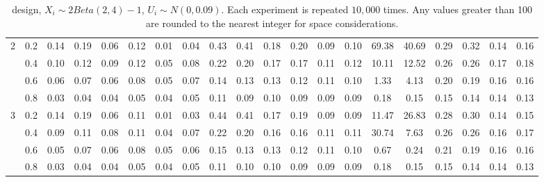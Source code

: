 \begin{table}
\begin{threeparttable}
\begin{tabular}{c c|c c c c c c|c c c c c c|c c c c c c}
\multirow{4}{*}{2} & 0.2 & 0.14 & 0.19 & 0.06 & 0.12 & 0.01 & 0.04 & 0.43 & 0.41 & 0.18 & 0.20 & 0.09 & 0.10 & 69.38 & 40.69 & 0.29 & 0.32 & 0.14 & 0.16 \\
& 0.4 & 0.10 & 0.12 & 0.09 & 0.12 & 0.05 & 0.08 & 0.22 & 0.20 & 0.17 & 0.17 & 0.11 & 0.12 & 10.11 & 12.52 & 0.26 & 0.26 & 0.17 & 0.18 \\
& 0.6 & 0.06 & 0.07 & 0.06 & 0.08 & 0.05 & 0.07 & 0.14 & 0.13 & 0.13 & 0.12 & 0.11 & 0.10 & 1.33 & 4.13 & 0.20 & 0.19 & 0.16 & 0.16 \\
& 0.8 & 0.03 & 0.04 & 0.04 & 0.05 & 0.04 & 0.05 & 0.11 & 0.09 & 0.10 & 0.09 & 0.09 & 0.09 & 0.18 & 0.15 & 0.15 & 0.14 & 0.14 & 0.13 \\
\hline
\multirow{4}{*}{3} & 0.2 & 0.14 & 0.19 & 0.06 & 0.11 & 0.01 & 0.03 & 0.44 & 0.41 & 0.17 & 0.19 & 0.09 & 0.09 & 11.47 & 26.83 & 0.28 & 0.30 & 0.14 & 0.15 \\
& 0.4 & 0.09 & 0.11 & 0.08 & 0.11 & 0.04 & 0.07 & 0.22 & 0.20 & 0.16 & 0.16 & 0.11 & 0.11 & 30.74 & 7.63 & 0.26 & 0.26 & 0.16 & 0.17 \\
& 0.6 & 0.05 & 0.07 & 0.06 & 0.08 & 0.05 & 0.06 & 0.15 & 0.13 & 0.13 & 0.12 & 0.11 & 0.10 & 0.67 & 0.24 & 0.21 & 0.19 & 0.16 & 0.16 \\
& 0.8 & 0.03 & 0.04 & 0.04 & 0.05 & 0.04 & 0.05 & 0.11 & 0.10 & 0.10 & 0.09 & 0.09 & 0.09 & 0.18 & 0.15 & 0.15 & 0.14 & 0.14 & 0.13 \\
\hline
\hline
\end{tabular}
\caption*{\citet{lee2008randomized} design, $X_i \sim 2Beta(2,4) - 1$, $U_i \sim N(0,0.09)$. Each experiment is repeated $10,000$ times. Any values greater than 100 are rounded to the nearest integer for space considerations.}
\label{table estimation lee beta}
\end{threeparttable}
\end{table}
